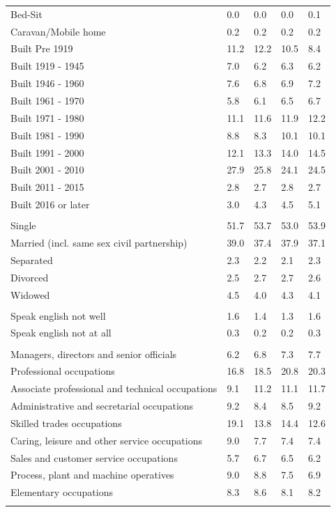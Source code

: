 \documentclass{article}
\begin{document}
\begin{table}[h]
\begin{tabular}{KTTTT}
Bed-Sit & 0.0& 0.0& 0.0& 0.1\\
Caravan/Mobile home & 0.2& 0.2& 0.2& 0.2\\
    \hline
Built Pre 1919 & 11.2& 12.2& 10.5&  8.4\\
Built 1919 - 1945 & 7.0& 6.2& 6.3& 6.2\\
Built  1946 - 1960 & 7.6& 6.8& 6.9& 7.2\\
Built  1961 - 1970 & 5.8& 6.1& 6.5& 6.7\\
Built  1971 - 1980 & 11.1& 11.6& 11.9& 12.2\\
Built  1981 - 1990 &  8.8&  8.3& 10.1& 10.1\\
Built  1991 - 2000 & 12.1& 13.3& 14.0& 14.5\\
Built  2001 - 2010 & 27.9& 25.8& 24.1& 24.5\\
Built  2011 - 2015 & 2.8& 2.7& 2.8& 2.7\\
Built  2016 or later & 3.0& 4.3& 4.5& 5.1\\
\hline
    \\
    \hline
Single & 51.7& 53.7& 53.0& 53.9\\
Married (incl. same sex civil partnership) & 39.0& 37.4& 37.9& 37.1\\
Separated  & 2.3& 2.2& 2.1& 2.3\\
Divorced  & 2.5& 2.7& 2.7& 2.6\\
Widowed & 4.5& 4.0& 4.3& 4.1\\
\hline
    \\ 
    \hline
Speak english not well & 1.6& 1.4& 1.3& 1.6\\
Speak english not at all & 0.3& 0.2& 0.2& 0.3\\
\hline
    \\
    \hline
Managers, directors and senior officials & 6.2& 6.8& 7.3& 7.7\\
Professional occupations & 16.8& 18.5& 20.8& 20.3\\
Associate professional and technical occupations &  9.1& 11.2& 11.1& 11.7\\
Administrative and secretarial occupations & 9.2& 8.4& 8.5& 9.2\\
Skilled trades occupations & 19.1& 13.8& 14.4& 12.6\\
Caring, leisure and other service occupations & 9.0& 7.7& 7.4& 7.4\\
Sales and customer service occupations & 5.7& 6.7& 6.5& 6.2\\
Process, plant and machine operatives & 9.0& 8.8& 7.5& 6.9\\
Elementary occupations & 8.3& 8.6& 8.1& 8.2\\
\hline
\end{tabular}
\end{table}
\end{document}
